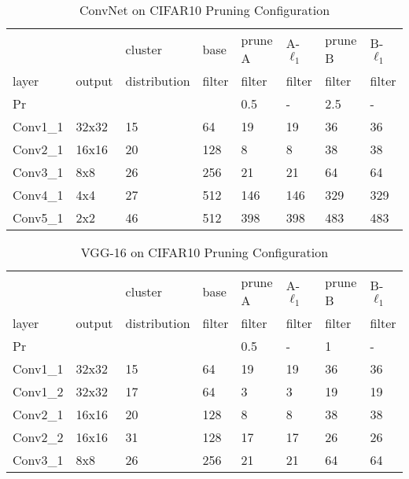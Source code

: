 \documentclass{article} %
\begin{document}
\begin{table}[h]
\caption{ConvNet on CIFAR10 Pruning Configuration}
\centering
\begin{tabular}{llllllll}
\toprule
                 &        & cluster & base   & prune A & A-$\ell_1$ & prune B & B-$\ell_1$	\\
layer            & output & distribution & filter & filter  & filter     & filter  & filter		\\ \midrule
Pr               &        &         &        & 0.5     & -       	& 2.5     & -			\\
Conv1\_1         & 32x32  & 15      & 64     & 19      & 19         & 36      & 36			\\
Conv2\_1         & 16x16  & 20      & 128    & 8       & 8        	& 38      & 38			\\
Conv3\_1         &  8x8   & 26      & 256    & 21      & 21        	& 64      & 64			\\
Conv4\_1         &  4x4   & 27      & 512    & 146     & 146       	& 329     & 329			\\
Conv5\_1         &  2x2   & 46      & 512    & 398     & 398     	& 483     & 483			\\ \bottomrule
\end{tabular}
\label{tab:ConvNet_app}
\end{table}\vspace{-2mm}\begin{table}[h]
\caption{VGG-16 on CIFAR10 Pruning Configuration}
\centering
\begin{tabular}{llllllll}
\toprule
                 &        &  cluster& base   & prune A & A-$\ell_1$ & prune B & B-$\ell_1$	\\
layer            & output & distribution& filter & filter  & filter     & filter  & filter		\\ \midrule
Pr               &        &         &        & 0.5     & -       	& 1       & -			\\
Conv1\_1         & 32x32  & 15      & 64     & 19      & 19         & 36      & 36			\\
Conv1\_2         & 32x32  & 17      & 64     & 3       & 3       	& 19      & 19			\\
Conv2\_1         & 16x16  & 20      & 128    & 8       & 8        	& 38      & 38			\\
Conv2\_2         & 16x16  & 31      & 128    & 17      & 17       	& 26      & 26			\\
Conv3\_1         &  8x8   & 26      & 256    & 21      & 21        	& 64      & 64			\\

\end{tabular}
\end{table}
\end{document}
